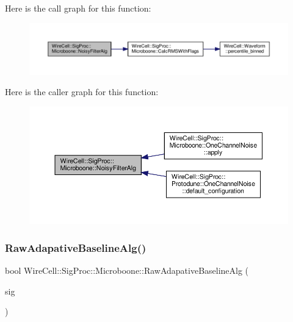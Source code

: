Here is the call graph for this function\+:
\nopagebreak
\begin{figure}[H]
\begin{center}
\leavevmode
\includegraphics[width=350pt]{namespace_wire_cell_1_1_sig_proc_1_1_microboone_a8e98649e920ae702925434c6fe7676b9_cgraph}
\end{center}
\end{figure}
Here is the caller graph for this function\+:
\nopagebreak
\begin{figure}[H]
\begin{center}
\leavevmode
\includegraphics[width=350pt]{namespace_wire_cell_1_1_sig_proc_1_1_microboone_a8e98649e920ae702925434c6fe7676b9_icgraph}
\end{center}
\end{figure}
\mbox{\label{namespace_wire_cell_1_1_sig_proc_1_1_microboone_a05c4b5687320b38db3ada0478e9b729b}} 
\subsubsection{\texorpdfstring{Raw\+Adapative\+Baseline\+Alg()}{RawAdapativeBaselineAlg()}}
{\footnotesize\ttfamily bool Wire\+Cell\+::\+Sig\+Proc\+::\+Microboone\+::\+Raw\+Adapative\+Baseline\+Alg (\begin{DoxyParamCaption}\item[{\hyperlink{namespace_wire_cell_1_1_waveform_a479175e541c8545e87cd8063b74b6956}{Wire\+Cell\+::\+Waveform\+::realseq\+\_\+t} \&}]{sig }\end{DoxyParamCaption})}




